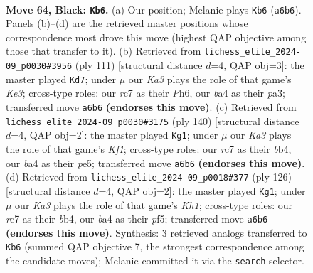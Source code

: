 \documentclass[11pt]{article}
\begin{document}
\clearpage

\begin{figure}[p]\centering
\begin{subfigure}{0.46\textwidth}\centering
\resizebox{\linewidth}{!}{%
\newchessgame
\chessboard[
  setfen={8/2R5/k7/5p2/B4P2/4K3/7P/8 b - - 0 64},
  showmover=false,
  pgfstyle=straightmove, color=movearrow, markmove={a6-b6}
]}
\caption{}
\end{subfigure}\hfill
\begin{subfigure}{0.46\textwidth}\centering
\resizebox{\linewidth}{!}{%
\newchessgame
\chessboard[
  setfen={8/p7/4k2p/1PK5/8/P7/7P/8 b - - 3 56},
  showmover=false,
  pgfstyle=straightmove, color=movearrow, markmove={e6-d7}
]}
\caption{}
\end{subfigure}
\\[4pt]
\begin{subfigure}{0.46\textwidth}\centering
\resizebox{\linewidth}{!}{%
\newchessgame
\chessboard[
  setfen={8/8/8/4p3/Pb6/5kp1/8/5K2 w - - 0 71},
  showmover=false,
  pgfstyle=straightmove, color=movearrow, markmove={f1-g1}
]}
\caption{}
\end{subfigure}\hfill
\begin{subfigure}{0.46\textwidth}\centering
\resizebox{\linewidth}{!}{%
\newchessgame
\chessboard[
  setfen={8/p7/8/5p2/1b6/1P4kp/8/7K w - - 2 64},
  showmover=false,
  pgfstyle=straightmove, color=movearrow, markmove={h1-g1}
]}
\caption{}
\end{subfigure}
\caption{\textbf{Move 64, Black: \texttt{Kb6}.} (a) Our position; Melanie plays \texttt{Kb6} (\texttt{a6b6}). Panels (b)--(d) are the retrieved master positions whose correspondence most drove this move (highest QAP objective among those that transfer to it). (b) Retrieved from \texttt{lichess\_elite\_2024-09\_p0030\#3956} (ply 111) [structural distance $d$=4, QAP obj=3]: the master played \texttt{Kd7}; under $\mu$ our \emph{Ka3} plays the role of that game's \emph{Ke3}; cross-type roles: our \emph{r}c7 as their \emph{P}h6, our \emph{b}a4 as their \emph{p}a3; transferred move \texttt{a6b6} \textbf{(endorses this move)}. (c) Retrieved from \texttt{lichess\_elite\_2024-09\_p0030\#3175} (ply 140) [structural distance $d$=4, QAP obj=2]: the master played \texttt{Kg1}; under $\mu$ our \emph{Ka3} plays the role of that game's \emph{Kf1}; cross-type roles: our \emph{r}c7 as their \emph{b}b4, our \emph{b}a4 as their \emph{p}e5; transferred move \texttt{a6b6} \textbf{(endorses this move)}. (d) Retrieved from \texttt{lichess\_elite\_2024-09\_p0018\#377} (ply 126) [structural distance $d$=4, QAP obj=2]: the master played \texttt{Kg1}; under $\mu$ our \emph{Ka3} plays the role of that game's \emph{Kh1}; cross-type roles: our \emph{r}c7 as their \emph{b}b4, our \emph{b}a4 as their \emph{p}f5; transferred move \texttt{a6b6} \textbf{(endorses this move)}. Synthesis: 3 retrieved analogs transferred to \texttt{Kb6} (summed QAP objective 7, the strongest correspondence among the candidate moves); Melanie committed it via the \texttt{search} selector.}
\label{fig:thought-m127}
\end{figure}
\end{document}
